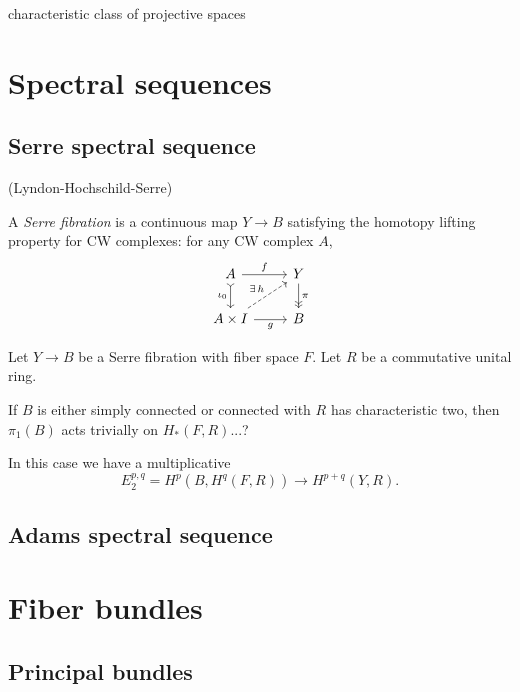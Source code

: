 \documentclass{../../large}
\begin{document}
characteristic class of projective spaces





\chapter{Spectral sequences}
\section{Serre spectral sequence}
	(Lyndon-Hochschild-Serre)



A \emph{Serre fibration} is a continuous map $Y\to B$ satisfying the homotopy lifting property for CW complexes: for any CW complex $A$,
\[\begin{tikzcd}
A\rar{f}\dar[>->,swap]{\iota_0}&Y\dar[->>]{\pi}\\
A\times I\rar[swap]{g}\ar[dashed]{ur}{\exists\,h}&B
\end{tikzcd}\]


\begin{prb}
Let $Y\to B$ be a Serre fibration with fiber space $F$.
Let $R$ be a commutative unital ring.
\begin{parts}
\item If $B$ is either simply connected or connected with $R$ has characteristic two, then $\pi_1(B)$ acts trivially on $H_*(F,R)$...?
\item In this case we have a multiplicative
\[E_2^{p,q}=H^p(B,H^q(F,R))\rightarrow H^{p+q}(Y,R).\]
\end{parts}
\end{prb}
\section{Adams spectral sequence}






\chapter{Fiber bundles}


\section{Principal bundles}
\end{document}
